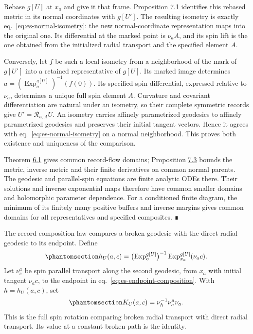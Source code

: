 \documentclass[
  english,
  11pt,
  reqno]{amsart}
\begin{document}
Rebase \(g[U]\) at \(x_a\) and give it that frame. Proposition
\hyperref[prop:es-normal-uniqueness]{7.1} identifies this rebased metric
in its normal coordinates with \(g[U']\). The resulting isometry is
exactly eq.~\ref{eq:es-normal-isometry}: the new normal-coordinate
representation maps into the original one. Its differential at the
marked point is \(\nu_aA\), and its spin lift is the one obtained from
the initialized radial transport and the specified element \(A\).

Conversely, let \(f\) be such a local isometry from a neighborhood of
the mark of \(g[U']\) into a retained representative of \(g[U]\). Its
marked image determines \(a=(\operatorname{Exp}^{g[U]}_o)^{-1}(f(0))\).
Its specified spin differential, expressed relative to \(\nu_a\),
determines a unique full spin element \(A\). Curvature and covariant
differentiation are natural under an isometry, so their complete
symmetric records give \(U'=\mathcal R_{a,A}U\). An isometry carries
affinely parametrized geodesics to affinely parametrized geodesics and
preserves their initial tangent vectors. Hence it agrees with
eq.~\ref{eq:es-normal-isometry} on a normal neighborhood. This proves
both existence and uniqueness of the comparison.

Theorem \hyperref[thm:es-flow]{6.1} gives common record-flow domains;
Proposition \hyperref[prop:es-uniform-realization]{7.3} bounds the
metric, inverse metric and their finite derivatives on common normal
parents. The geodesic and parallel-spin equations are finite analytic
ODEs there. Their solutions and inverse exponential maps therefore have
common smaller domains and holomorphic parameter dependence. For a
conditioned finite diagram, the minimum of its finitely many positive
buffers and inverse margins gives common domains for all representatives
and specified composites. ∎

The record composition law compares a broken geodesic with the direct
radial geodesic to its endpoint. Define
\begin{equation}\protect\phantomsection\label{eq:es-endpoint-composition}{
 h_U(a,c)
 =\bigl(\operatorname{Exp}^{g[U]}_o\bigr)^{-1}
    \operatorname{Exp}^{g[U]}_{x_a}(\nu_ac).
}\end{equation} Let \(\nu^{a}_c\) be spin parallel transport along the
second geodesic, from \(x_a\) with initial tangent \(\nu_ac\), to the
endpoint in eq.~\ref{eq:es-endpoint-composition}. With \(h=h_U(a,c)\),
set \begin{equation}\protect\phantomsection\label{eq:es-spin-holonomy}{
 K_U(a,c)=\nu_h^{-1}\nu^{a}_c\nu_a.
}\end{equation} This is the full spin rotation comparing broken radial
transport with direct radial transport. Its value at a constant broken
path is the identity.
\end{document}
